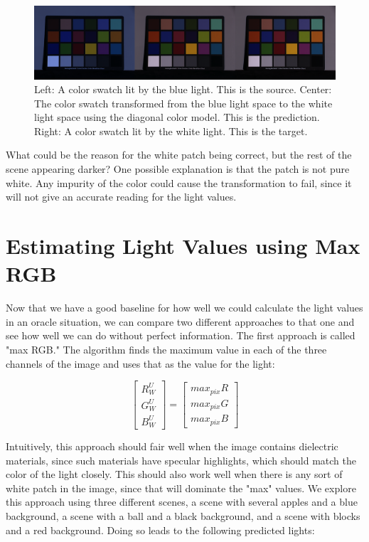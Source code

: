 \documentclass{article}
\begin{document}
\begin{figure}[!ht]
	\centering
	\includegraphics[width=160mm]{figs/macbeth-comparison.png}
	\caption{Left: A color swatch lit by the blue light. This is the source. 
        Center: The color 
        swatch transformed from the blue light space to the white light space 
        using the diagonal color model. 
        This is the prediction.
        Right: A color swatch lit by the white light. This is the target.}
\end{figure}

What could be the reason for the white patch being correct, but the rest of the 
scene appearing darker? One possible explanation is that the patch is not pure 
white. Any impurity of the color could cause the transformation to fail, since 
it will not give an accurate reading for the light values.

\section{Estimating Light Values using Max RGB}

Now that we have a good baseline for how well we could calculate the light 
values in an oracle situation, we can compare two different approaches to that 
one and see how well we can do without perfect information. The first approach 
is called "max RGB." The algorithm finds the maximum value in each of the three 
channels of the image and uses that as the value for the light:

$$
\begin{bmatrix}
    R^U_W \\
    G^U_W \\
    B^U_W
\end{bmatrix} = \begin{bmatrix}
    max_{pix} R \\
    max_{pix} G \\
    max_{pix} B
\end{bmatrix}
$$

Intuitively, this approach should fair well when the image contains dielectric 
materials, since such materials have specular highlights, which should match the 
color of the light closely. This should also work well when there is any sort of 
white patch in the image, since that will dominate the "max" values. We explore 
this approach using three different scenes, a scene with 
several apples and a blue background, a scene with a ball and a black background, 
and a scene with blocks and a red background. Doing so leads to the following 
predicted lights:
\end{document}
